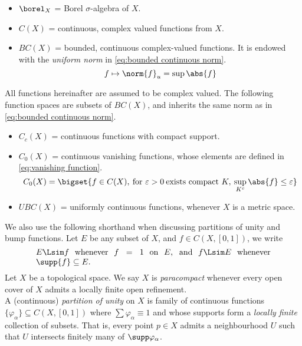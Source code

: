 \documentclass[../main-v2-manifolds.tex]{subfiles}
\begin{document}
\begin{itemize}
    \item $\borel_X$ = Borel $\sigma$-algebra of $X$.
    \item $C(X)$ = continuous, complex valued functions from $X$.
    \item $BC(X)$ = bounded, continuous complex-valued functions. It is endowed with the \emph{uniform norm} in \cref{eq:bounded continuous norm}.
    \begin{equation}
        f\mapsto \norm{f}_u = \sup \abs{f}
        \label{eq:bounded continuous norm}
    \end{equation}
\end{itemize}
All functions hereinafter are assumed to be complex valued. The following function spaces are subsets of $BC(X)$, and inherits the same norm as in \cref{eq:bounded continuous norm}.
\begin{itemize}
    \item $C_c(X)$ = continuous functions with compact support. 
    \item $C_0(X)$ = continuous vanishing functions, whose elements are defined in \cref{eq:vanishing function}. 
    \begin{equation}
        C_0(X) = \bigset{f\in C(X),\: \text{for }\varepsilon>0\: \text{exists compact } K,\: \sup_{K^c}\abs{f}\leq\varepsilon}
        \label{eq:vanishing function}
    \end{equation}
    \item $UBC(X)$ = uniformly continuous functions, whenever $X$ is a metric space.
\end{itemize}
We also use the following shorthand when discussing partitions of unity and bump functions. Let $E$ be any subset of $X$, and $f\in C(X,[0,1])$, we write
\[
    \parbox{10cm}{$E\Lsim f$ whenever $f=1$ on $E$, and
    $f\Lsim E$ whenever $\supp{f}\subseteq E$.}
\]
Let $X$ be a topological space. We say $X$ is \emph{paracompact} whenever every open cover of $X$ admits a locally finite open refinement. \\

A (continuous) \emph{partition of unity} on $X$ is family of continuous functions $\{\varphi_\alpha\}\subseteq C(X,[0,1])$ where $\sum \varphi_\alpha\equiv 1$ and whose supports form a \emph{locally finite} collection of subsets. That is, every point $p\in X$ admits a neighbourhood $U$ such that $U$ intersects finitely many of $\supp \varphi_\alpha$. \\
\end{document}
